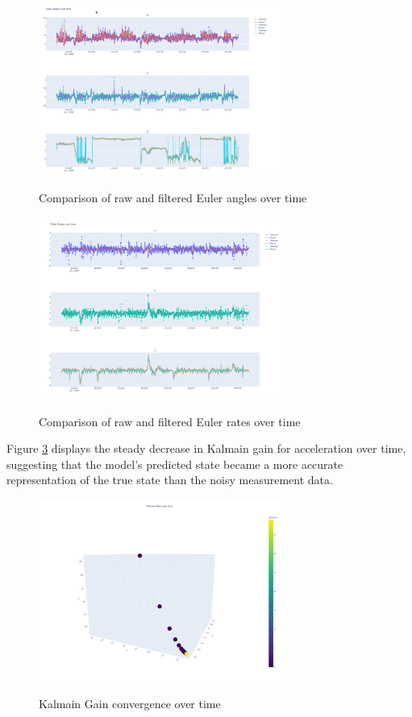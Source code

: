 \documentclass[12pt]{article}
\begin{document}
\begin{figure}[H]
    \centering
    \includegraphics[width=300px]{figures/eul_obs_comparison.png}\\
    \caption{Comparison of raw and filtered Euler angles  over time}
    \label{fig:euler}
\end{figure}
\begin{figure}[H]
    \centering
    \includegraphics[width=300px]{figures/eulr_obs_comparison.png}\\
    \caption{Comparison of raw and filtered Euler rates  over time}
    \label{fig:rate}
\end{figure}

Figure \ref{fig:gain} displays the steady decrease in Kalmain gain for acceleration over time, suggesting that the model's predicted state became a more accurate representation of the true state than the noisy measurement data. 

\begin{figure}[H]
    \centering
    \includegraphics[width=300px]{figures/kalman_gain.png}\\
    \caption{Kalmain Gain convergence over time}
    \label{fig:gain}
\end{figure}
\end{document}
